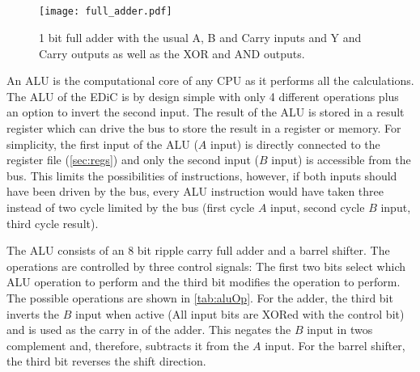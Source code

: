 \subsection{}\label{sec:alu}
\begin{figure}[t]
  \centering
  \texttt{[image: full\_adder.pdf]}
  \caption{1 bit full adder with the usual A, B and Carry inputs and Y and Carry outputs as well as the XOR and AND outputs.}
  \label{fig:full_adder}
\end{figure}
An \gls{ALU} is the computational core of any \gls{CPU} as it performs all the calculations.
The \gls{ALU} of the \gls{EDiC} is by design simple with only 4 different operations plus an option to invert the second input.
The result of the \gls{ALU} is stored in a result register which can drive the bus to store the result in a register or memory.
For simplicity, the first input of the \gls{ALU} ($A$ input) is directly connected to the register file (\cref{sec:regs}) and only the second input ($B$ input) is accessible from the bus.
This limits the possibilities of instructions, however, if both inputs should have been driven by the bus, every \gls{ALU} instruction would have taken three instead of two cycle limited by the bus (first cycle $A$ input, second cycle $B$ input, third cycle result).

The \gls{ALU} consists of an 8 bit ripple carry full adder and a barrel shifter.
The operations are controlled by three control signals: The first two bits select which \gls{ALU} operation to perform and the third bit modifies the operation to perform.
The possible operations are shown in \cref{tab:aluOp}.
For the adder, the third bit inverts the $B$ input when active (All input bits are XORed with the control bit) and is used as the carry in of the adder.
This negates the $B$ input in twos complement and, therefore, subtracts it from the $A$ input.
For the barrel shifter, the third bit reverses the shift direction.

